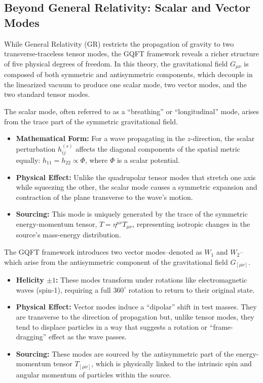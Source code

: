 \subsection{Beyond General Relativity: Scalar and Vector Modes}
\label{sub_sec:beyond_general_relativity_scalar_and_vector_modes}

While General Relativity (GR) restricts the propagation of gravity to two transverse-traceless tensor modes, the GQFT framework reveals a richer structure of five physical degrees of freedom. In this theory, the gravitational field $G_{\mu\nu}$ is composed of both symmetric and antisymmetric components, which decouple in the linearized vacuum to produce one scalar mode, two vector modes, and the two standard tensor modes.

The scalar mode, often referred to as a ``breathing'' or ``longitudinal'' mode, arises from the trace part of the symmetric gravitational field.
\begin{itemize}
  \item \textbf{Mathematical Form:} For a wave propagating in the $z$-direction, the scalar perturbation $h^{(s)}_{ij}$ affects the diagonal components of the spatial metric equally: $h_{11} = h_{22} \propto \Phi$, where $\Phi$ is a scalar potential.
  \item \textbf{Physical Effect:} Unlike the quadrupolar tensor modes that stretch one axis while squeezing the other, the scalar mode causes a symmetric expansion and contraction of the plane transverse to the wave's motion.
  \item \textbf{Sourcing:} This mode is uniquely generated by the trace of the symmetric energy-momentum tensor, $T = \eta^{\mu\nu}T_{\mu\nu}$, representing isotropic changes in the source's mass-energy distribution.
\end{itemize}

The GQFT framework introduces two vector modes--denoted as $W_1$ and $W_2$--which arise from the antisymmetric component of the gravitational field $G_{[\mu\nu]}$.
\begin{itemize}
  \item \textbf{Helicity $\pm 1$:} These modes transform under rotations like electromagnetic waves (spin-1), requiring a full $360^\circ$ rotation to return to their original state.
  \item \textbf{Physical Effect:} Vector modes induce a ``dipolar'' shift in test masses. They are transverse to the direction of propagation but, unlike tensor modes, they tend to displace particles in a way that suggests a rotation or ``frame-dragging'' effect as the wave passes.
  \item \textbf{Sourcing:} These modes are sourced by the antisymmetric part of the energy-momentum tensor $T_{[\mu\nu]}$, which is physically linked to the intrinsic spin and angular momentum of particles within the source.
\end{itemize}

